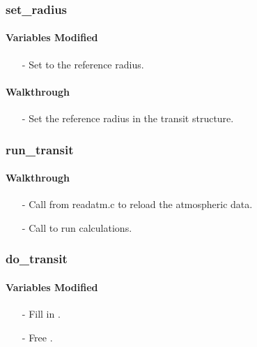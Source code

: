 \documentclass[letterpaper,12pt]{article}
\begin{document}
\subsubsection{set\_radius}
\paragraph{Variables Modified}
\begin{enumerate}[leftmargin=10pt, noitemsep, parsep=0pt, topsep=0ex]
\item[-] Set  to the reference radius.
\end{enumerate}

\paragraph{Walkthrough}
\begin{enumerate}[leftmargin=10pt, noitemsep, parsep=0pt, topsep=0ex]
\item[-] Set the reference radius in the transit structure.
\end{enumerate}

\subsubsection{run\_transit}
\paragraph{Walkthrough}
\begin{enumerate}[leftmargin=10pt, noitemsep, parsep=0pt, topsep=0ex]
\item[-] Call  from readatm.c to reload the atmospheric data.
\item[-] Call  to run calculations.
\end{enumerate}
\subsubsection{do\_transit}
\paragraph{Variables Modified}
\begin{enumerate}[leftmargin=10pt, noitemsep, parsep=0pt, topsep=0ex]
\item[-] Fill in .
\item[-] Free .
\end{enumerate}
\end{document}

